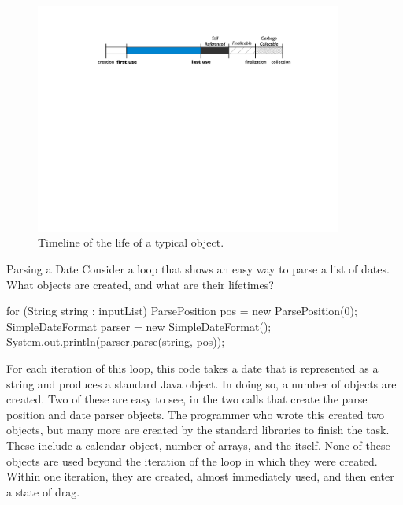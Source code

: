 \begin{figure}
	\includegraphics[width=0.9\textwidth]{part2/Figures/lifetime/object-lifecycle}
	\caption{Timeline of the life of a typical object.}
	\label{fig:typical-lifecycle}
\end{figure}


\begin{example}{Parsing a Date} Consider a loop that shows an easy way to parse
a list of dates. What objects are created, and what are their lifetimes?
\begin{shortlisting}
for (String string : inputList) {
	ParsePosition pos = new ParsePosition(0);
	SimpleDateFormat parser = new SimpleDateFormat();
	System.out.println(parser.parse(string, pos));
}
\end{shortlisting}
\end{example}

For each iteration of this loop, this code takes a date that is represented as a
string and produces a standard Java  object. In doing so, a number of
objects are created. Two of these are easy to see, in the two  calls
that create the parse position and date parser objects. The programmer who wrote
this created two objects, but many more are created by the standard libraries to
finish the task. These include a calendar object, number of arrays, and the
 itself. None of these objects are used beyond the iteration of the
loop in which they were created. Within one iteration, they are created, almost
immediately used, and then enter a state of drag.


